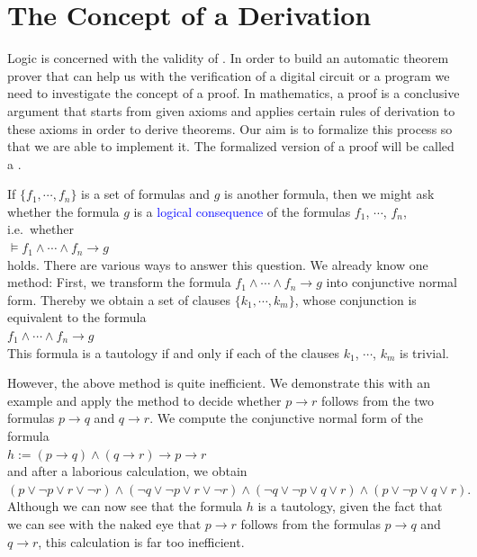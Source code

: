 \section{The Concept of a Derivation}
Logic is concerned with the validity of . In order to build an automatic theorem prover that can 
help us with the verification of a digital circuit or a program we need to investigate the concept of a proof.
In mathematics, a proof is a conclusive argument that starts from given axioms and applies certain rules of
derivation to these axioms in order to derive theorems.  Our aim is to formalize this process so that we are
able to implement it. The formalized version of a proof will be called a .

If $\{f_1,\cdots,f_n\}$ is a set of formulas and $g$ is another formula, then
we might ask whether the formula $g$ is a \textcolor{blue}{logical consequence} of the formulas $f_1$,
$\cdots$, $f_n$, i.e.~whether
\\[0.2cm]
\hspace*{1.3cm}
$\models f_1 \wedge \cdots \wedge f_n \rightarrow g$
\\[0.2cm]
holds.
There are various ways to answer this question.  We already know one method:
First, we transform the formula $f_1 \wedge \cdots \wedge f_n \rightarrow g$ into
conjunctive normal form.  Thereby we obtain a set of clauses
$\{k_1,\cdots,k_m\}$, whose conjunction is equivalent to the formula
\\[0.2cm]
\hspace*{1.3cm}
$f_1 \wedge \cdots \wedge f_n \rightarrow g$
\\[0.2cm]
This formula is a tautology if and only if each of the clauses $k_1$, $\cdots$, $k_m$ is trivial.

However, the above method is quite inefficient. We demonstrate this with an
example and apply the method
to decide whether $p \rightarrow r$ follows from the two formulas $p \rightarrow q$ and
$q \rightarrow r$. We compute the conjunctive normal form of the formula
\\[0.2cm]
\hspace*{1.3cm}
$h := (p \rightarrow q) \wedge (q \rightarrow r) \rightarrow p \rightarrow r$
\\[0.2cm]
and after a laborious calculation, we obtain
\\[0.2cm]
\hspace*{1.3cm}
$(p \vee \neg p \vee r \vee \neg r) \wedge (\neg q \vee \neg p \vee r \vee \neg r) \wedge
     (\neg q \vee \neg p \vee q \vee r) \wedge (p \vee \neg p \vee q \vee r).
$
\\[0.2cm]
Although we can now see that the formula $h$ is a tautology, given the
fact that we can see with the naked eye that $p \rightarrow r$ follows from the formulas $p \rightarrow q$ and
$q \rightarrow r$, this calculation is far too inefficient.

